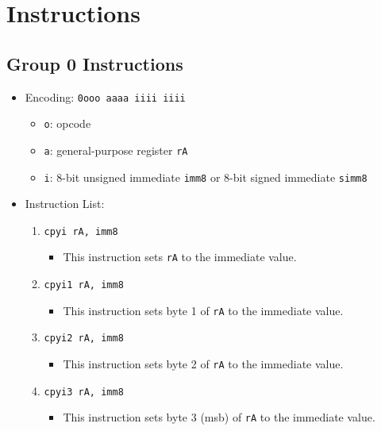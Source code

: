 \documentclass{article}
\begin{document}
\section{Instructions}
	\subsection{Group 0 Instructions}
		\begin{itemize}
		\item Encoding:  \texttt{0ooo aaaa iiii iiii}
			\begin{itemize}
			\item \texttt{o}:  opcode
			\item \texttt{a}:  general-purpose register \texttt{rA}
			\item \texttt{i}:  8-bit unsigned immediate \texttt{imm8} or
				8-bit signed immediate \texttt{simm8}
			\end{itemize}
		\item Instruction List:
			\begin{enumerate}
			\item \texttt{cpyi rA, imm8}
				\begin{itemize}
				\item This instruction sets \texttt{rA} to the immediate
					value.
				\end{itemize}
			\item \texttt{cpyi1 rA, imm8}
				\begin{itemize}
				\item This instruction sets byte 1 of \texttt{rA} to the
					immediate value.
				\end{itemize}
			\item \texttt{cpyi2 rA, imm8}
				\begin{itemize}
				\item This instruction sets byte 2 of \texttt{rA} to the
					immediate value.
				\end{itemize}
			\item \texttt{cpyi3 rA, imm8}
				\begin{itemize}
				\item This instruction sets byte 3 (msb) of \texttt{rA} to
					the immediate value.
				\end{itemize}


\end{enumerate}
\end{itemize}
\end{document}
